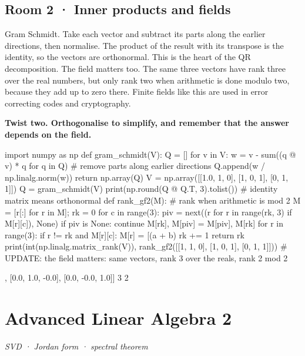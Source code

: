 \documentclass[11pt,a4paper]{report}
\begin{document}
\section*{Room 2 · Inner products and fields}
Gram Schmidt. Take each vector and subtract its parts along the earlier directions, then normalise. The product of the result with its transpose is the identity, so the vectors are orthonormal. This is the heart of the QR decomposition. The field matters too. The same three vectors have rank three over the real numbers, but only rank two when arithmetic is done modulo two, because they add up to zero there. Finite fields like this are used in error correcting codes and cryptography.
\begin{tcolorbox}[colback=yellow!12,colframe=orange!70!black,boxrule=0.4pt,left=4pt,right=4pt,top=2pt,bottom=2pt]\textbf{Twist two. Orthogonalise to simplify, and remember that the answer depends on the field.}\end{tcolorbox}
\begin{Code}
import numpy as np
def gram_schmidt(V):
    Q = []
    for v in V:
        w = v - sum((q @ v) * q for q in Q)     # remove parts along earlier directions
        Q.append(w / np.linalg.norm(w))
    return np.array(Q)
V = np.array([[1.0, 1, 0], [1, 0, 1], [0, 1, 1]])
Q = gram_schmidt(V)
print(np.round(Q @ Q.T, 3).tolist())       # identity matrix means orthonormal
def rank_gf2(M):                            # rank when arithmetic is mod 2
    M = [r[:] for r in M]; rk = 0
    for c in range(3):
        piv = next((r for r in range(rk, 3) if M[r][c]), None)
        if piv is None: continue
        M[rk], M[piv] = M[piv], M[rk]
        for r in range(3):
            if r != rk and M[r][c]: M[r] = [(a + b) %
        rk += 1
    return rk
print(int(np.linalg.matrix_rank(V)), rank_gf2([[1, 1, 0], [1, 0, 1], [0, 1, 1]]))
# UPDATE: the field matters: same vectors, rank 3 over the reals, rank 2 mod 2
\end{Code}
\begin{Out}
[[1.0, 0.0, 0.0], [0.0, 1.0, -0.0], [0.0, -0.0, 1.0]]
3 2
\end{Out}
\chapter{Advanced Linear Algebra 2}
\textit{SVD · Jordan form · spectral theorem}
\end{document}
